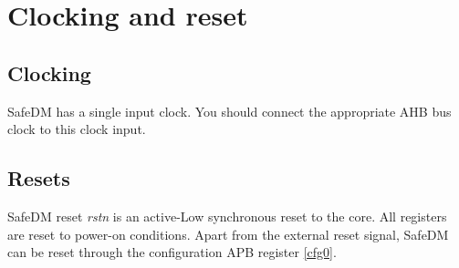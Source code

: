 \section{Clocking and reset}

\subsection{Clocking}
SafeDM has a single input clock. You should connect the appropriate AHB bus clock to this clock input. 

\subsection{Resets}
SafeDM reset \textit{rstn} is an active-Low synchronous reset to the core. All registers are reset to power-on conditions. Apart from the external reset signal, SafeDM can be reset through the configuration APB register \ref{cfg0}.  


